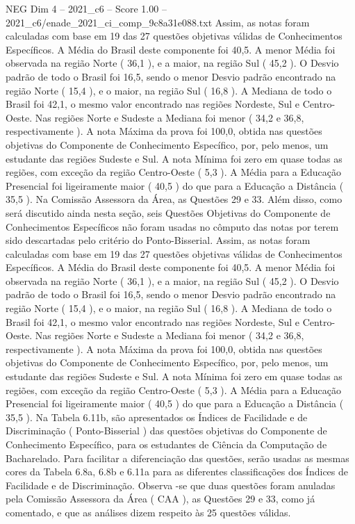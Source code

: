 \begin{textsample}{NEG Dim 4 – 2021\_c6 – Score 1.00 – 2021\_c6/enade\_2021\_ci\_comp\_9c8a31e088.txt}
Assim, as notas foram calculadas com base em 19 das 27 questões objetivas válidas de Conhecimentos Específicos.
A Média do Brasil deste componente foi 40,5.
A menor Média foi observada na região Norte ( 36,1 ), e a maior, na região Sul ( 45,2 ).
O Desvio padrão de todo o Brasil foi 16,5, sendo o menor Desvio padrão encontrado na região Norte ( 15,4 ), e o maior, na região Sul ( 16,8 ).
A Mediana de todo o Brasil foi 42,1, o mesmo valor encontrado nas regiões Nordeste, Sul e Centro-Oeste.
Nas regiões Norte e Sudeste a Mediana foi menor ( 34,2 e 36,8, respectivamente ).
A nota Máxima da prova foi 100,0, obtida nas questões objetivas do Componente de Conhecimento Específico, por, pelo menos, um estudante das regiões Sudeste e Sul.
A nota Mínima foi zero em quase todas as regiões, com exceção da região Centro-Oeste ( 5,3 ).
A Média para a Educação Presencial foi ligeiramente maior ( 40,5 ) do que para a Educação a Distância ( 35,5 ).
Na Comissão Assessora da Área, as Questões 29 e 33.
Além disso, como será discutido ainda nesta seção, seis Questões Objetivas do Componente de Conhecimentos Específicos não foram usadas no cômputo das notas por terem sido descartadas pelo critério do Ponto-Bisserial.
Assim, as notas foram calculadas com base em 19 das 27 questões objetivas válidas de Conhecimentos Específicos.
A Média do Brasil deste componente foi 40,5.
A menor Média foi observada na região Norte ( 36,1 ), e a maior, na região Sul ( 45,2 ).
O Desvio padrão de todo o Brasil foi 16,5, sendo o menor Desvio padrão encontrado na região Norte ( 15,4 ), e o maior, na região Sul ( 16,8 ).
A Mediana de todo o Brasil foi 42,1, o mesmo valor encontrado nas regiões Nordeste, Sul e Centro-Oeste.
Nas regiões Norte e Sudeste a Mediana foi menor ( 34,2 e 36,8, respectivamente ).
A nota Máxima da prova foi 100,0, obtida nas questões objetivas do Componente de Conhecimento Específico, por, pelo menos, um estudante das regiões Sudeste e Sul.
A nota Mínima foi zero em quase todas as regiões, com exceção da região Centro-Oeste ( 5,3 ).
A Média para a Educação Presencial foi ligeiramente maior ( 40,5 ) do que para a Educação a Distância ( 35,5 ).
Na Tabela 6.11b, são apresentados os Índices de Facilidade e de Discriminação ( Ponto-Bisserial ) das questões objetivas do Componente de Conhecimento Específico, para os estudantes de Ciência da Computação de Bacharelado.
Para facilitar a diferenciação das questões, serão usadas as mesmas cores da Tabela 6.8a, 6.8b e 6.11a para as diferentes classificações dos Índices de Facilidade e de Discriminação.
Observa -se que duas questões foram anuladas pela Comissão Assessora da Área ( CAA ), as Questões 29 e 33, como já comentado, e que as análises dizem respeito às 25 questões válidas.

\end{textsample}
